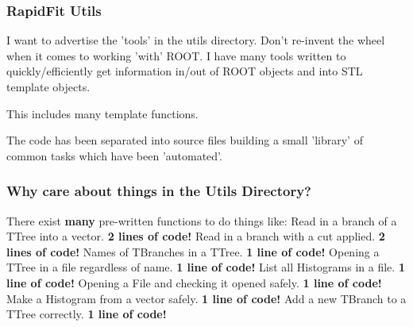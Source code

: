 \documentclass{beamer}
\begin{document}
\begin{frame}
\frametitle{RapidFit Utils}
I want to advertise the 'tools' in the utils directory.\newline\newline
Don't re-invent the wheel when it comes to working 'with' ROOT.\newline
I have many tools written to quickly/efficiently get information in/out of ROOT objects and into STL template objects.\newline

This includes many template functions.\newline

The code has been separated into source files building a small 'library' of common tasks which have been 'automated'.\newline
\end{frame}
\begin{frame}
\frametitle{Why care about things in the Utils Directory?}
There exist \textbf{many} pre-written functions to do things like:\newline\newline
Read in a branch of a TTree into a vector. \textbf{2 lines of code!}\newline
Read in a branch with a cut applied. \textbf{2 lines of code!}\newline
Names of TBranches in a TTree. \textbf{1 line of code!}\newline
Opening a TTree in a file regardless of name. \textbf{1 line of code!}\newline
List all Histograms in a file. \textbf{1 line of code!}\newline
Opening a File and checking it opened safely. \textbf{1 line of code!}\newline
Make a Histogram from a vector safely. \textbf{1 line of code!}\newline
Add a new TBranch to a TTree correctly. \textbf{1 line of code!}\newline

\end{frame}
\end{document}
